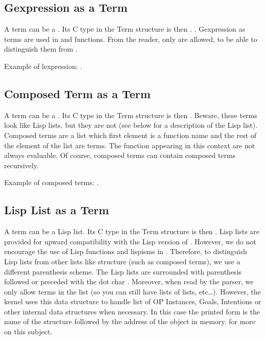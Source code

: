 \subsection{Gexpression as a Term}

A term can be a . Its C type in the Term structure is then .
. Gexpression as terms are used in  and
 functions. From the reader, only  are allowed,
to be able to distinguish them from .

Example of lexpression: .

\subsection{Composed Term as a Term}

A term can be a . Its C type in the Term structure is then .
Beware, these terms look like Lisp lists, but they are not (see below for a
description of the Lisp list). Composed terms are a list which first element is a
function name and the rest of the element of the list are terms. The function
appearing in this context are not always evaluable. Of course, composed terms
can contain composed terms recursively.

Example of composed terms: .

\subsection{Lisp List as a Term}

A term can be a Lisp list. Its C type in the Term structure is then . Lisp lists are
provided for upward compatibility with the Lisp version of \OPRS{}. However, we
do not encourage the use of Lisp functions and lispisms in \COPRS{}. Therefore,
to distinguish Lisp lists from other lists like structure (such as composed
terms), we use a different parenthesis scheme. The Lisp lists are surrounded
with parenthesis followed or preceded with the dot char .  Moreover,
when read by the parser, we only allow terms in the list (so you can still have
lists of lists, etc\dots{}). However, the kernel uses this data structure to
handle list of OP Instances, Goals, Intentions or other internal data structures
when necessary.  In this case the printed form is the name of the structure
followed by the address of the object in memory.  
for more on this subject.

